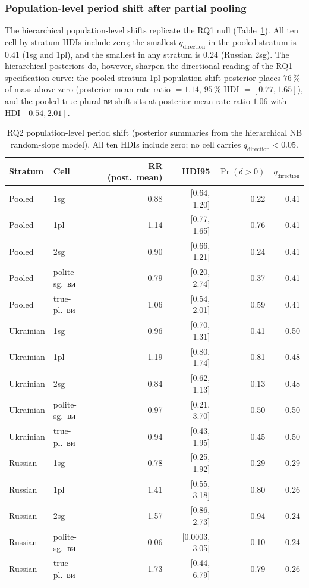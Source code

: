 \documentclass[12pt]{interact}
\theoremstyle{plain}%
\theoremstyle{definition}
\theoremstyle{remark}
\begin{document}
\subsubsection{Population-level period shift after partial pooling}

The hierarchical population-level shifts replicate the RQ1 null (Table~\ref{tab:rq2-pop}). All ten cell-by-stratum HDIs include zero; the smallest $q_{\text{direction}}$ in the pooled stratum is $0.41$ (1sg and 1pl), and the smallest in any stratum is $0.24$ (Russian 2sg). The hierarchical posteriors do, however, sharpen the directional reading of the RQ1 specification curve: the pooled-stratum 1pl population shift posterior places $76\,\%$ of mass above zero (posterior mean rate ratio $= 1.14$, $95\,\%$ HDI $= [0.77, 1.65]$), and the pooled true-plural \textukrainian{ви} shift sits at posterior mean rate ratio $1.06$ with HDI $[0.54, 2.01]$.

\begin{table}[h]
\caption{RQ2 population-level period shift (posterior summaries from the hierarchical NB random-slope model). All ten HDIs include zero; no cell carries $q_{\text{direction}} < 0.05$.}
\label{tab:rq2-pop}
\centering
\small
\begin{tabular}{llrrrr}
\toprule
Stratum & Cell & RR (post.\ mean) & HDI95 & $\Pr(\delta > 0)$ & $q_{\text{direction}}$ \\
\midrule
Pooled & 1sg & 0.88 & [0.64, 1.20] & 0.22 & 0.41 \\
Pooled & 1pl & 1.14 & [0.77, 1.65] & 0.76 & 0.41 \\
Pooled & 2sg & 0.90 & [0.66, 1.21] & 0.24 & 0.41 \\
Pooled & polite-sg.~\textukrainian{ви} & 0.79 & [0.20, 2.74] & 0.37 & 0.41 \\
Pooled & true-pl.~\textukrainian{ви} & 1.06 & [0.54, 2.01] & 0.59 & 0.41 \\
Ukrainian & 1sg & 0.96 & [0.70, 1.31] & 0.41 & 0.50 \\
Ukrainian & 1pl & 1.19 & [0.80, 1.74] & 0.81 & 0.48 \\
Ukrainian & 2sg & 0.84 & [0.62, 1.13] & 0.13 & 0.48 \\
Ukrainian & polite-sg.~\textukrainian{ви} & 0.97 & [0.21, 3.70] & 0.50 & 0.50 \\
Ukrainian & true-pl.~\textukrainian{ви} & 0.94 & [0.43, 1.95] & 0.45 & 0.50 \\
Russian & 1sg & 0.78 & [0.25, 1.92] & 0.29 & 0.29 \\
Russian & 1pl & 1.41 & [0.55, 3.18] & 0.80 & 0.26 \\
Russian & 2sg & 1.57 & [0.86, 2.73] & 0.94 & 0.24 \\
Russian & polite-sg.~\textukrainian{ви} & 0.06 & [0.0003, 3.05] & 0.10 & 0.24 \\
Russian & true-pl.~\textukrainian{ви} & 1.73 & [0.44, 6.79] & 0.79 & 0.26 \\
\bottomrule
\end{tabular}
\end{table}
\end{document}
